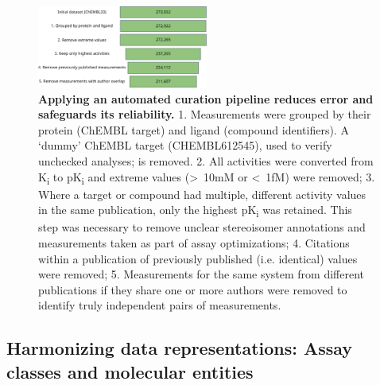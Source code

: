 \documentclass[9pt,lessons]{livecoms}
\begin{document}
\begin{figure}[tbp]
    \centering
    \includegraphics[width=0.5\textwidth]{figures/kinodata_filtering.pdf}
    \caption{
    {\bf Applying an automated curation pipeline reduces error and safeguards its reliability. } 1. Measurements were grouped by their protein (ChEMBL target) and ligand (compound identifiers). A `dummy' ChEMBL target (CHEMBL612545), used to verify unchecked analyses; is removed. 2. %
    All activities were converted from K\textsubscript{i} to pK\textsubscript{i} and extreme values (\textgreater\ 10mM or \textless\ 1fM) were removed; 3. Where a target or compound had multiple, different activity values in the same publication, only the highest pK\textsubscript{i} was retained. This step was necessary to remove unclear stereoisomer annotations and measurements taken as part of assay optimizations; 4. Citations within a publication of previously published (i.e. identical) values were removed; 5. Measurements for the same system from different publications if they share one or more authors were removed to identify truly independent pairs of measurements.
    }
    \label{fig:chembl_processing}
\end{figure}





\subsection{Harmonizing data representations: Assay classes and molecular entities}
\end{document}

